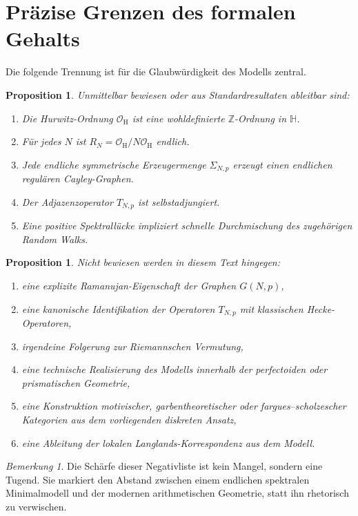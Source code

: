 \documentclass[12pt,a4paper]{article}
\theoremstyle{plain}
\newtheorem{proposition}[satz]{Proposition}
\theoremstyle{definition}
\theoremstyle{remark}
\newtheorem{bemerkung}[satz]{Bemerkung}
\newcommand{\Z}{\mathbb{Z}}
\newcommand{\HH}{\mathbb{H}}
\newcommand{\OH}{\mathcal{O}_{\mathrm H}}
\newcommand{\RN}{R_N}
\newcommand{\SNp}{\Sigma_{N,p}}
\newcommand{\GNp}{G(N,p)}
\newcommand{\TNp}{T_{N,p}}
\begin{document}
\section{Präzise Grenzen des formalen Gehalts}
Die folgende Trennung ist für die Glaubwürdigkeit des Modells zentral.

\begin{proposition}
Unmittelbar bewiesen oder aus Standardresultaten ableitbar sind:
\begin{enumerate}[label=\arabic*.]
\item Die Hurwitz-Ordnung \(\OH\) ist eine wohldefinierte \(\Z\)-Ordnung in \(\HH\).
\item Für jedes \(N\) ist \(\RN=\OH/N\OH\) endlich.
\item Jede endliche symmetrische Erzeugermenge \(\SNp\) erzeugt einen endlichen regulären Cayley-Graphen.
\item Der Adjazenzoperator \(\TNp\) ist selbstadjungiert.
\item Eine positive Spektrallücke impliziert schnelle Durchmischung des zugehörigen Random Walks.
\end{enumerate}
\end{proposition}

\begin{proposition}
Nicht bewiesen werden in diesem Text hingegen:
\begin{enumerate}[label=\arabic*.]
\item eine explizite Ramanujan-Eigenschaft der Graphen \(\GNp\),
\item eine kanonische Identifikation der Operatoren \(\TNp\) mit klassischen Hecke-Operatoren,
\item irgendeine Folgerung zur Riemannschen Vermutung,
\item eine technische Realisierung des Modells innerhalb der perfectoiden oder prismatischen Geometrie,
\item eine Konstruktion motivischer, garbentheoretischer oder fargues--scholzescher Kategorien aus dem vorliegenden diskreten Ansatz,
\item eine Ableitung der lokalen Langlands-Korrespondenz aus dem Modell.
\end{enumerate}
\end{proposition}

\begin{bemerkung}
Die Schärfe dieser Negativliste ist kein Mangel, sondern eine Tugend. Sie markiert den Abstand zwischen einem endlichen spektralen Minimalmodell und der modernen arithmetischen Geometrie, statt ihn rhetorisch zu verwischen.
\end{bemerkung}
\end{document}
